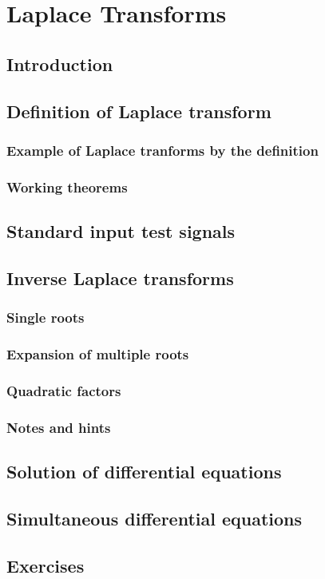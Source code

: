 \chapter{Laplace Transforms}
\section{Introduction}
\section{Definition of Laplace transform}
\subsection{Example of Laplace tranforms by the definition}
\subsection{Working theorems}
\section{Standard input test signals}
\section{Inverse Laplace transforms}
\subsection{Single roots}
\subsection{Expansion of multiple roots}
\subsection{Quadratic factors}
\subsection{Notes and hints}
\section{Solution of differential equations}
\section{Simultaneous differential equations}
\section{Exercises}
